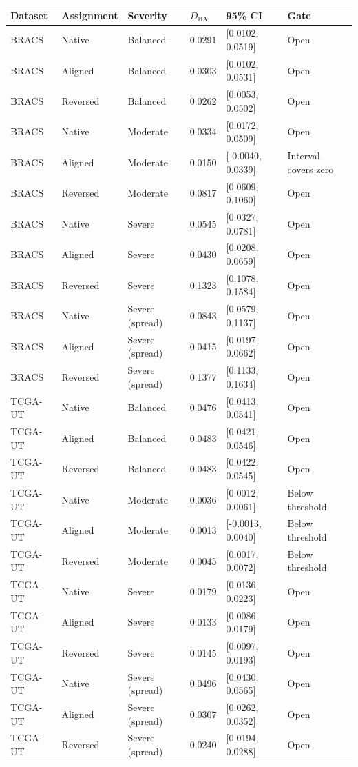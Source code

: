\begin{tabular}{llllll}
\toprule
Dataset & Assignment & Severity & $D_{\mathrm{BA}}$ & 95\% CI & Gate \\
\midrule
BRACS & Native & Balanced & 0.0291 & [0.0102, 0.0519] & Open \\
BRACS & Aligned & Balanced & 0.0303 & [0.0102, 0.0531] & Open \\
BRACS & Reversed & Balanced & 0.0262 & [0.0053, 0.0502] & Open \\
BRACS & Native & Moderate & 0.0334 & [0.0172, 0.0509] & Open \\
BRACS & Aligned & Moderate & 0.0150 & [-0.0040, 0.0339] & Interval covers zero \\
BRACS & Reversed & Moderate & 0.0817 & [0.0609, 0.1060] & Open \\
BRACS & Native & Severe & 0.0545 & [0.0327, 0.0781] & Open \\
BRACS & Aligned & Severe & 0.0430 & [0.0208, 0.0659] & Open \\
BRACS & Reversed & Severe & 0.1323 & [0.1078, 0.1584] & Open \\
BRACS & Native & Severe (spread) & 0.0843 & [0.0579, 0.1137] & Open \\
BRACS & Aligned & Severe (spread) & 0.0415 & [0.0197, 0.0662] & Open \\
BRACS & Reversed & Severe (spread) & 0.1377 & [0.1133, 0.1634] & Open \\
TCGA-UT & Native & Balanced & 0.0476 & [0.0413, 0.0541] & Open \\
TCGA-UT & Aligned & Balanced & 0.0483 & [0.0421, 0.0546] & Open \\
TCGA-UT & Reversed & Balanced & 0.0483 & [0.0422, 0.0545] & Open \\
TCGA-UT & Native & Moderate & 0.0036 & [0.0012, 0.0061] & Below threshold \\
TCGA-UT & Aligned & Moderate & 0.0013 & [-0.0013, 0.0040] & Below threshold \\
TCGA-UT & Reversed & Moderate & 0.0045 & [0.0017, 0.0072] & Below threshold \\
TCGA-UT & Native & Severe & 0.0179 & [0.0136, 0.0223] & Open \\
TCGA-UT & Aligned & Severe & 0.0133 & [0.0086, 0.0179] & Open \\
TCGA-UT & Reversed & Severe & 0.0145 & [0.0097, 0.0193] & Open \\
TCGA-UT & Native & Severe (spread) & 0.0496 & [0.0430, 0.0565] & Open \\
TCGA-UT & Aligned & Severe (spread) & 0.0307 & [0.0262, 0.0352] & Open \\
TCGA-UT & Reversed & Severe (spread) & 0.0240 & [0.0194, 0.0288] & Open \\
\bottomrule
\end{tabular}
